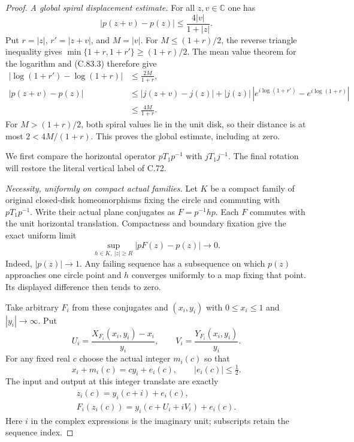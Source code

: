 \begin{proof}
\emph{A global spiral displacement estimate.}
For all $z,v\in\mathbb C$ one has
\[
              |p(z+v)-p(z)|
                  \leq\frac{4|v|}{1+|z|}.                       \tag{C.86.4}
\]
Put $r=|z|$, $r'=|z+v|$, and $M=|v|$.
For $M\leq(1+r)/2$, the reverse triangle
inequality gives
$\min\{1+r,1+r'\}\geq(1+r)/2$.
The mean value theorem for the logarithm
and (C.83.3) therefore give
\[
 \begin{split}
 |\log(1+r')-\log(1+r)|&\leq\frac{2M}{1+r},\\
 |p(z+v)-p(z)|
  &\leq |j(z+v)-j(z)|
       +|j(z)|\,|e^{i\log(1+r')}-e^{i\log(1+r)}|\\
  &\leq\frac{4M}{1+r}.
 \end{split}                                                     \tag{C.86.5}
\]
For $M>(1+r)/2$, both spiral values lie
in the unit disk, so their distance
is at most $2<4M/(1+r)$. This proves
the global estimate, including at zero.

We first compare the horizontal operator
$pT_1p^{-1}$ with $jT_1j^{-1}$.
The final rotation will restore the
literal vertical label of C.72.

\emph{Necessity, uniformly on compact actual families.}
Let $K$ be a compact family of original
closed-disk homeomorphisms fixing the
circle and commuting with $pT_1p^{-1}$.
Write their actual plane conjugates as
$F=p^{-1}hp$.
Each $F$ commutes with the unit horizontal
translation. Compactness and boundary
fixation give the exact uniform limit
\[
 \sup_{h\in K,\ |z|\geq R}|pF(z)-p(z)|
                              \longrightarrow0.
                                                               \tag{C.86.6}
\]
Indeed, $|p(z)|\to1$. Any failing
sequence has a subsequence on which
$p(z)$ approaches one circle point
and $h$ converges uniformly to a map
fixing that point. Its displayed
difference then tends to zero.

Take arbitrary $F_i$ from these conjugates
and $(x_i,y_i)$ with $0\leq x_i\leq1$
and $|y_i|\to\infty$. Put
\[
 U_i=\frac{X_{F_i}(x_i,y_i)-x_i}{y_i},\qquad
 V_i=\frac{Y_{F_i}(x_i,y_i)}{y_i}.
                                                               \tag{C.86.7}
\]
For any fixed real $c$ choose the actual
integer $m_i(c)$ so that
\[
 x_i+m_i(c)=cy_i+e_i(c),\qquad |e_i(c)|\leq\tfrac12.
                                                               \tag{C.86.8}
\]
The input and output at this integer
translate are exactly
\[
 \begin{gathered}
 z_i(c)=y_i(c+i)+e_i(c),\\
 F_i(z_i(c))=y_i(c+U_i+iV_i)+e_i(c).
 \end{gathered}                                                   \tag{C.86.9}
\]
Here $i$ in the complex expressions is
the imaginary unit; subscripts retain
the sequence index.


\end{proof}

